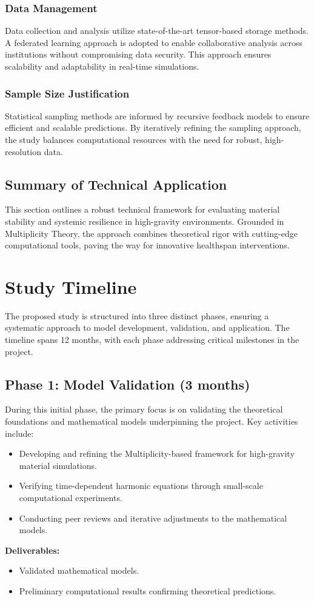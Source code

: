 \documentclass{article}
\theoremstyle{plain}
\begin{document}
\subsubsection{Data Management}
Data collection and analysis utilize state-of-the-art tensor-based storage methods. A federated learning approach is adopted to enable collaborative analysis across institutions without compromising data security. This approach ensures scalability and adaptability in real-time simulations.

\subsubsection{Sample Size Justification}
Statistical sampling methods are informed by recursive feedback models to ensure efficient and scalable predictions. By iteratively refining the sampling approach, the study balances computational resources with the need for robust, high-resolution data.

\subsection{Summary of Technical Application}
This section outlines a robust technical framework for evaluating material stability and systemic resilience in high-gravity environments. Grounded in Multiplicity Theory, the approach combines theoretical rigor with cutting-edge computational tools, paving the way for innovative healthspan interventions.

\section{Study Timeline}

The proposed study is structured into three distinct phases, ensuring a systematic approach to model development, validation, and application. The timeline spans 12 months, with each phase addressing critical milestones in the project.

\subsection{Phase 1: Model Validation (3 months)}
During this initial phase, the primary focus is on validating the theoretical foundations and mathematical models underpinning the project. Key activities include:
\begin{itemize}
    \item Developing and refining the Multiplicity-based framework for high-gravity material simulations.
    \item Verifying time-dependent harmonic equations through small-scale computational experiments.
    \item Conducting peer reviews and iterative adjustments to the mathematical models.
\end{itemize}
\textbf{Deliverables:}
\begin{itemize}
    \item Validated mathematical models.
    \item Preliminary computational results confirming theoretical predictions.
\end{itemize}
\end{document}
